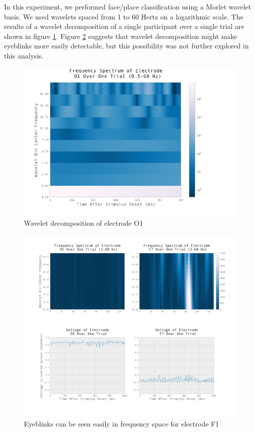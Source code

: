 \documentclass[12pt]{report}
\begin{document}
	In this experiment, we performed face/place classification using a Morlet wavelet basis.  We used wavelets spaced from 1 to 60 Hertz on a logarithmic scale.  The results of a wavelet decomposition of a single participant over a single trial are shown in figure \ref{wavelet_decomp}.  Figure \ref{eyeblinkwav} suggests that wavelet decomposition might make eyeblinks more easily detectable, but this possibility was not further explored in this analysis.

\begin{figure}[t]
\centering
\includegraphics[width=6in]{wavelet_transform_O1_halfto60}
\caption{Wavelet decomposition of electrode O1\label{wavelet_decomp}}
\end{figure}

\begin{figure}[t]
\centering
\includegraphics[width=5.5in]{eyebink_wavelets_compare}
\caption{Eyeblinks can be seen easily in frequency space for electrode F1\label{eyeblinkwav}}
\end{figure}
	
\end{document}
